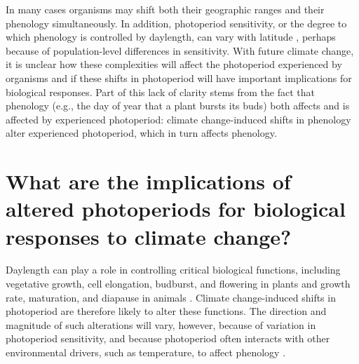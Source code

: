 \documentclass{article}
\begin{document}
\par In many cases organisms may shift both their geographic ranges and their phenology simultaneously. %
In addition, photoperiod sensitivity, or the degree to which phenology is controlled by daylength, can vary with latitude \citep{Howe:1996,saikkonen2012,Partanen:2005aa,Vihera-Aarnio:2006aa,Caffarra:2011b,gauzere2017}, perhaps because of population-level differences in sensitivity.%
With future climate change, it is unclear how these complexities will affect the photoperiod experienced by organisms and if these shifts in photoperiod will have important implications for biological responses. Part of this lack of clarity stems from the fact that phenology (e.g., the day of year that a plant bursts its buds) %
both affects and is affected by experienced photoperiod: climate change-induced shifts in phenology alter experienced photoperiod, which in turn affects phenology.%


\section*{What are the implications of altered photoperiods for biological responses to climate change?}
\par Daylength can play a role in controlling critical biological functions, including vegetative growth, cell elongation, budburst, and flowering in plants \citep{Linkosalo:2006aa,erwin1998,sidaway2010,Hsu:2011,Heide:2011aa,Ashby:1962aa,Heide:2012aa,mimura2007} and growth rate, maturation, and diapause in animals \citep{muir1994,bradshaw2006,saunders1970,tobin2008}. Climate change-induced shifts in photoperiod are therefore likely to alter these functions. The direction and magnitude of such alterations will vary, however, because of variation in photoperiod sensitivity, and because photoperiod often interacts with other environmental drivers, such as temperature, to affect phenology \citep [Box 1,][]{zydlewski2014}. 
\end{document}
